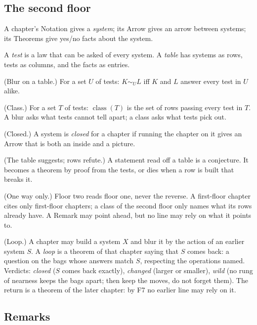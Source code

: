 \subsection*{The second floor}

\begin{lines}
\item[\lab{F1}] A chapter's Notation gives a \emph{system}; its Arrow gives an arrow between systems; its Theorems give yes/no facts about the system.
\item[\lab{F2}] A \emph{test} is a law that can be asked of every system. A \emph{table} has systems as rows, tests as columns, and the facts as entries.
\item[\lab{F3}] (Blur on a table.) For a set $U$ of tests: $K \sim_U L$ iff $K$ and $L$ answer every test in $U$ alike.
\item[\lab{F4}] (Class.) For a set $T$ of tests: $\operatorname{class}(T)$ is the set of rows passing every test in $T$. A blur asks what tests cannot tell apart; a class asks what tests pick out.
\item[\lab{F5}] (Closed.) A system is \emph{closed} for a chapter if running the chapter on it gives an Arrow that is both an inside and a picture.
\item[\lab{F6}] (The table suggests; rows refute.) A statement read off a table is a conjecture. It becomes a theorem by proof from the tests, or dies when a row is built that breaks it.
\item[\lab{F7}] (One way only.) Floor two reads floor one, never the reverse. A first-floor chapter cites only first-floor chapters; a class of the second floor only names what its rows already have. A Remark may point ahead, but no line may rely on what it points to.
\item[\lab{F8}] (Loop.) A chapter may build a system $X$ and blur it by the action of an earlier system $S$. A \emph{loop} is a theorem of that chapter saying that $S$ comes back: a question on the bags whose answers match $S$, respecting the operations named. Verdicts: \emph{closed} ($S$ comes back exactly), \emph{changed} (larger or smaller), \emph{wild} (no rung of nearness keeps the bags apart; then keep the moves, do not forget them). The return is a theorem of the later chapter: by F7 no earlier line may rely on it.
\end{lines}

\subsection*{Remarks}

